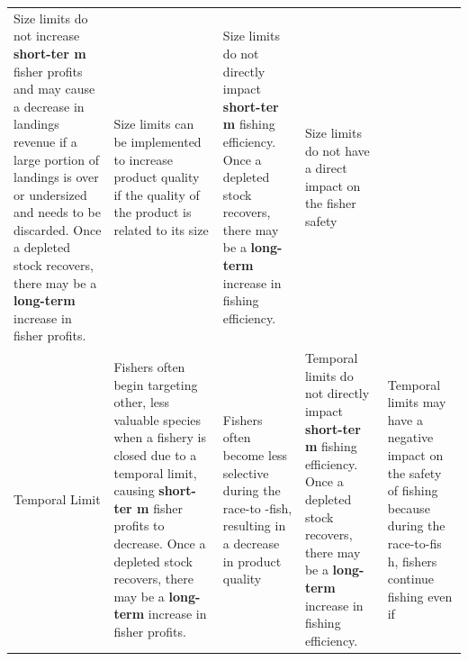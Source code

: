 \documentclass[]{book}
\begin{document}
\begin{longtable}[]{@{}lllll@{}}
\begin{minipage}[t]{0.17\columnwidth}
Size limits do not increase \textbf{short-ter m} fisher profits and may
cause a decrease in landings revenue if a large portion of landings is
over or undersized and needs to be discarded. Once a depleted stock
recovers, there may be a \textbf{long-term } increase in fisher
profits.\strut
\end{minipage} & \begin{minipage}[t]{0.17\columnwidth}\raggedright\strut
Size limits can be implemented to increase product quality if the
quality of the product is related to its size\strut
\end{minipage} & \begin{minipage}[t]{0.17\columnwidth}\raggedright\strut
Size limits do not directly impact \textbf{short-ter m} fishing
efficiency. Once a depleted stock recovers, there may be a
\textbf{long-term } increase in fishing efficiency.\strut
\end{minipage} & \begin{minipage}[t]{0.17\columnwidth}\raggedright\strut
Size limits do not have a direct impact on the fisher safety\strut
\end{minipage}\tabularnewline
\begin{minipage}[t]{0.17\columnwidth}\raggedright\strut
Temporal Limit\strut
\end{minipage} & \begin{minipage}[t]{0.17\columnwidth}\raggedright\strut
Fishers often begin targeting other, less valuable species when a
fishery is closed due to a temporal limit, causing \textbf{short-ter m}
fisher profits to decrease. Once a depleted stock recovers, there may be
a \textbf{long-term } increase in fisher profits.\strut
\end{minipage} & \begin{minipage}[t]{0.17\columnwidth}\raggedright\strut
Fishers often become less selective during the race-to -fish, resulting
in a decrease in product quality\strut
\end{minipage} & \begin{minipage}[t]{0.17\columnwidth}\raggedright\strut
Temporal limits do not directly impact \textbf{short-ter m} fishing
efficiency. Once a depleted stock recovers, there may be a
\textbf{long-term } increase in fishing efficiency.\strut
\end{minipage} & \begin{minipage}[t]{0.17\columnwidth}\raggedright\strut
Temporal limits may have a negative impact on the safety of fishing
because during the race-to-fis h, fishers continue fishing even if

\end{minipage}
\end{longtable}
\end{document}
